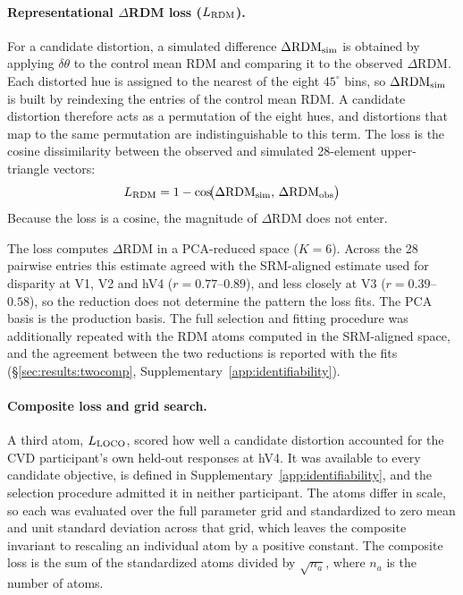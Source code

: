 \paragraph{Representational $\Delta$RDM loss ($L_{\rm RDM}$).}
For a candidate distortion, a simulated difference $\Delta\text{RDM}_{\rm sim}$ is obtained by applying $\delta\theta$ to the control mean RDM and comparing it to the observed $\Delta\text{RDM}$. Each distorted hue is assigned to the nearest of the eight $45^\circ$ bins, so $\Delta\text{RDM}_{\rm sim}$ is built by reindexing the entries of the control mean RDM. A candidate distortion therefore acts as a permutation of the eight hues, and distortions that map to the same permutation are indistinguishable to this term. The loss is the cosine dissimilarity between the observed and simulated 28-element upper-triangle vectors:
%
\begin{equation}
  L_{\rm RDM} = 1 - \cos\!\bigl(\Delta\text{RDM}_{\rm sim},\,
    \Delta\text{RDM}_{\rm obs}\bigr)
  \label{eq:lrdm}
\end{equation}
%
Because the loss is a cosine, the magnitude of $\Delta$RDM does not enter.

The loss computes $\Delta$RDM in a PCA-reduced space ($K = 6$). Across the 28 pairwise entries this estimate agreed with the SRM-aligned estimate used for disparity at V1, V2 and hV4 ($r = 0.77$--$0.89$), and less closely at V3 ($r = 0.39$--$0.58$), so the reduction does not determine the pattern the loss fits. The PCA basis is the production basis. The full selection and fitting procedure was additionally repeated with the RDM atoms computed in the SRM-aligned space, and the agreement between the two reductions is reported with the fits (\S\ref{sec:results:twocomp}, Supplementary~\cref{app:identifiability}).

\paragraph{Composite loss and grid search.}
A third atom, $L_{\rm LOCO}$, scored how well a candidate distortion accounted for the CVD participant's own held-out responses at hV4. It was available to every candidate objective, is defined in Supplementary~\cref{app:identifiability}, and the selection procedure admitted it in neither participant. The atoms differ in scale, so each was evaluated over the full parameter grid and standardized to zero mean and unit standard deviation across that grid, which leaves the composite invariant to rescaling an individual atom by a positive constant. The composite loss is the sum of the standardized atoms divided by $\sqrt{n_a}$, where $n_a$ is the number of atoms.

